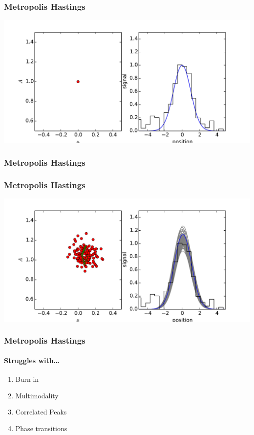 \documentclass[%
]{beamer}
\begin{document}
\begin{frame}
  \frametitle{Metropolis Hastings} 
  \includegraphics[width=\textwidth]{movies/MCMC_0.pdf}
\end{frame}
\begin{frame}
  \frametitle{Metropolis Hastings} 
\end{frame}
\begin{frame}
  \frametitle{Metropolis Hastings} 
  \includegraphics[width=\textwidth]{movies/MCMC_1.pdf}
\end{frame}




\begin{frame}
  \frametitle{Metropolis Hastings} 
  \framesubtitle{Struggles with\ldots}
  \pause
  \begin{enumerate}
      \item Burn in
      \item Multimodality
      \item Correlated Peaks
      \item Phase transitions
  \end{enumerate}
\end{frame}
\end{document}
